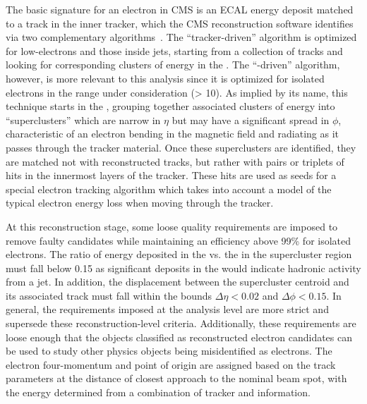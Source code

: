 The basic signature for an electron in CMS is an ECAL energy deposit matched to a track in the inner tracker, which the CMS reconstruction software identifies via two complementary algorithms~\cite{CMS-PAS-EGM-10-004}.  The ``tracker-driven'' algorithm is optimized for low-\pt electrons and those inside jets, starting from a collection of tracks and looking for corresponding clusters of energy in the \ecal.  The ``\ecal-driven'' algorithm, however, is more relevant to this analysis since it is optimized for isolated electrons in the \pt range under consideration (\pt > 10).  As implied by its name, this technique starts in the \ecal, grouping together associated clusters of energy into ``superclusters'' which are narrow in $\eta$ but may have a significant spread in $\phi$, characteristic of an electron bending in the magnetic field and radiating as it passes through the tracker material.  Once these superclusters are identified, they are matched not with reconstructed tracks, but rather with pairs or triplets of hits in the innermost layers of the tracker.  These hits are used as seeds for a special electron tracking algorithm which takes into account a model of the typical electron energy loss when moving through the tracker.

At this reconstruction stage, some loose quality requirements are imposed to remove faulty candidates while maintaining an efficiency above 99\% for isolated electrons.  The ratio of energy deposited in the \hcal vs. the \ecal in the supercluster region must fall below 0.15 as significant deposits in the \hcal would indicate hadronic activity from a jet.  In addition, the displacement between the supercluster centroid and its associated track must fall within the bounds $\Delta\eta < 0.02$ and $\Delta\phi < 0.15$.  In general, the requirements imposed at the analysis level are more strict and supersede these reconstruction-level criteria.  Additionally, these requirements are loose enough that the objects classified as reconstructed electron candidates can be used to study other physics objects being misidentified as electrons.  The electron four-momentum and point of origin are assigned based on the track parameters at the distance of closest approach to the nominal beam spot, with the energy determined from a combination of tracker and \ecal information.


